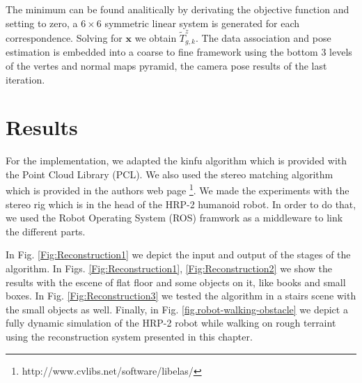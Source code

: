 The minimum can be found analitically by derivating the objective function and setting to zero, a $6 \times 6$ symmetric linear system is generated for each correspondence. Solving for $\mathbf{x}$ we obtain $\tilde{T}^z_{g,k}$.
The data association and pose estimation is embedded into a coarse to fine framework using the bottom 3 levels of the vertes and normal maps pyramid, the camera pose results of the last iteration.

\section{Results}

For the implementation, we adapted the kinfu algorithm which is provided with the Point Cloud Library (PCL). We also used the stereo matching algorithm which is provided in the authors web page \footnote{http://www.cvlibs.net/software/libelas/}. We made the experiments with the stereo rig which is in the head of the HRP-2 humanoid robot. In order to do that, we used the Robot Operating System (ROS) framwork as a middleware to link the different parts.

In Fig. \ref{Fig:Reconstruction1} we depict the input and output of the stages of the algorithm. In Figs. \ref{Fig:Reconstruction1}, \ref{Fig:Reconstruction2} we show the results with the escene of flat floor and some objects on it, like books and small boxes. In Fig. \ref{Fig:Reconstruction3} we tested the algorithm in a stairs scene with the small objects as well. Finally, in Fig. \ref{fig.robot-walking-obstacle} we depict a fully dynamic simulation of the HRP-2 robot while walking on rough terraint using the reconstruction system presented in this chapter.

